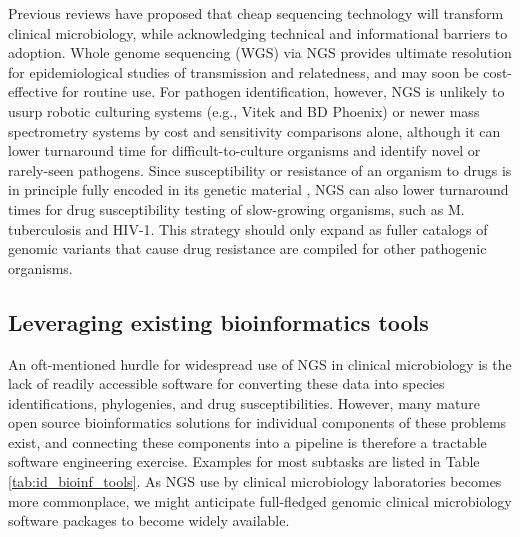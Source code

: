 Previous reviews \autocite{Didelot2012,Koser2012} have proposed that cheap sequencing technology will transform clinical microbiology, while acknowledging technical and informational barriers to adoption. Whole genome sequencing (WGS) via NGS provides ultimate resolution for epidemiological studies of transmission and relatedness, and may soon be cost-effective for routine use.\autocite{Didelot2012,Koser2012} For pathogen identification, however, NGS is unlikely to usurp robotic culturing systems (e.g., Vitek and BD Phoenix) or newer mass spectrometry systems by cost and sensitivity comparisons alone, although it can lower turnaround time for difficult-to-culture organisms and identify novel or rarely-seen pathogens.\autocite{Koser2012,Naccache2015} Since susceptibility or resistance of an organism to drugs is in principle fully encoded in its genetic material \autocite{Didelot2012,Gordon2014}, NGS can also lower turnaround times for drug susceptibility testing of slow-growing organisms, such as M. tuberculosis \autocite{Boehme2010} and HIV-1.\autocite{Ram2015} This strategy should only expand as fuller catalogs of genomic variants that cause drug resistance are compiled for other pathogenic organisms.

\subsection{Leveraging existing bioinformatics tools}

An oft-mentioned hurdle\autocite{Didelot2012,Koser2012} for widespread use of NGS in clinical microbiology is the lack of readily accessible software for converting these data into species identifications, phylogenies, and drug susceptibilities. However, many mature open source bioinformatics solutions for individual components of these problems exist, and connecting these components into a pipeline is therefore a tractable software engineering exercise. Examples for most subtasks are listed in Table \ref{tab:id_bioinf_tools}. As NGS use by clinical microbiology laboratories becomes more commonplace, we might anticipate full-fledged genomic clinical microbiology software packages to become widely available.

